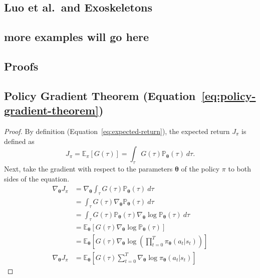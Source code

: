 \documentclass[12pt]{report}
\theoremstyle{definition}
\theoremstyle{remark}
\begin{document}
\cite{hutter_legged_2022}
\cite{lee_learning_2020}

\section{Luo et al.\ and Exoskeletons}
\cite{luo_reinforcement_2021}
\cite{luo_experiment-free_2024}


\section{more examples will go here}


\begin{appendices}
\chapter{Proofs}
\section{Policy Gradient Theorem (Equation~\ref{eq:policy-gradient-theorem})}\label{sec:policy-gradient-theorem-proof}
\begin{proof}
    By definition (Equation~\ref{eq:expected-return}), the expected return $J_\pi$ is defined as
    \begin{equation*}
        J_\pi = \mathbb{E}_\pi[G(\tau)] = \int_{\tau} G(\tau)\mathbb{P}_{\boldsymbol{\theta}}(\tau)\ d\tau.
    \end{equation*}
    Next, take the gradient with respect to the parameters $\boldsymbol{\theta}$ of the policy $\pi$ to both sides of the equation.
    \begin{align*}
        \nabla_{\boldsymbol{\theta}} J_\pi &= \nabla_{\boldsymbol{\theta}} \int_{\tau} G(\tau)\mathbb{P}_{\boldsymbol{\theta}}(\tau)\ d\tau \\
        &= \int_{\tau} G(\tau) \nabla_{\boldsymbol{\theta}} \mathbb{P}_{\boldsymbol{\theta}}(\tau)\ d\tau \tag{by Leibniz integral rule} \\
        &= \int_{\tau} G(\tau) \mathbb{P}_{\boldsymbol{\theta}}(\tau) \nabla_{\boldsymbol{\theta}} \log \mathbb{P}_{\boldsymbol{\theta}}(\tau)\ d\tau \tag{by the chain rule} \\
        &= \mathbb{E}_{\boldsymbol{\theta}}\left[G(\tau) \nabla_{\boldsymbol{\theta}} \log \mathbb{P}_{\boldsymbol{\theta}}(\tau)\right] \tag{by definition of expectation} \\
        &= \mathbb{E}_{\boldsymbol{\theta}}\left[G(\tau) \nabla_{\boldsymbol{\theta}} \log \left(\prod_{t=0}^{T} \pi_{\boldsymbol{\theta}}(a_t | s_t)\right)\right] \tag{deconstructing probability of $\tau$} \\
        \nabla_{\boldsymbol{\theta}} J_\pi &= \mathbb{E}_{\boldsymbol{\theta}}\left[G(\tau) \sum_{t=0}^{T} \nabla_{\boldsymbol{\theta}} \log \pi_{\boldsymbol{\theta}}(a_t | s_t)\right]
    \end{align*}
\end{proof}
\end{appendices}







\nocite{*} %

\printglossaries

\printbibliography
{}
\end{document}
